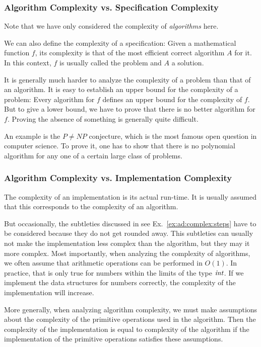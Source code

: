 \subsubsection{Algorithm Complexity vs. Specification Complexity}

Note that we have only considered the complexity of \emph{algorithms} here.

We can also define the complexity of a specification: Given a mathematical function $f$, its complexity is that of the most efficient correct algorithm $A$ for it.
In this context, $f$ is usually called the problem and $A$ a solution.

It is generally much harder to analyze the complexity of a problem than that of an algorithm.
It is easy to establish an upper bound for the complexity of a problem: Every algorithm for $f$ defines an upper bound for the complexity of $f$.
But to give a lower bound, we have to prove that there is no better algorithm for $f$.
Proving the absence of something is generally quite difficult.

An example is the $P\neq NP$ conjecture, which is the most famous open question in computer science.
To prove it, one has to show that there is no polynomial algorithm for any one of a certain large class of problems.

\subsubsection{Algorithm Complexity vs. Implementation Complexity}

The complexity of an implementation is its actual run-time.
It is usually assumed that this corresponds to the complexity of an algorithm.

But occasionally, the subtleties discussed in see Ex.~\ref{ex:ad:complex:steps} have to be considered because they do not get rounded away.
This subtleties can usually not make the implementation less complex than the algorithm, but they may it more complex.
Most importantly, when analyzing the complexity of algorithms, we often assume that arithmetic operations can be performed in $O(1)$.
In practice, that is only true for numbers within the limits of the type $\mathit{int}$.
If we implement the data structures for numbers correctly, the complexity of the implementation will increase.

More generally, when analyzing algorithm complexity, we must make assumptions about the complexity of the primitive operations used in the algorithm.
Then the complexity of the implementation is equal to complexity of the algorithm if the implementation of the primitive operations satisfies these assumptions.


